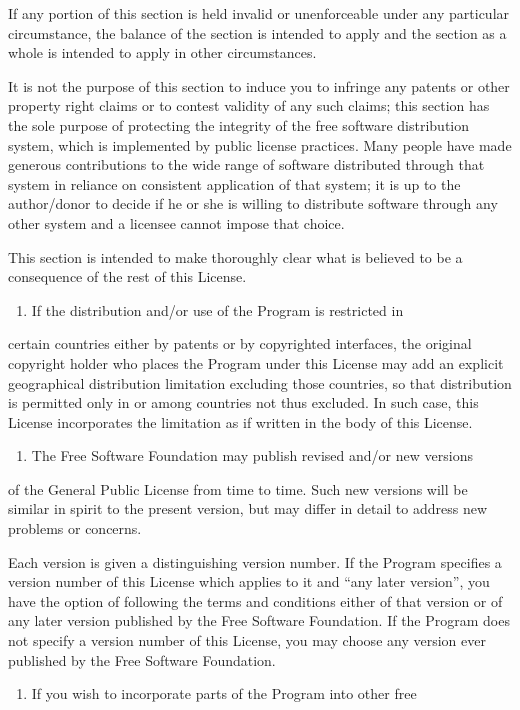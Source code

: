 \documentclass[letterpaper,10pt,english]{sphinxmanual}
\begin{document}
If any portion of this section is held invalid or unenforceable under
any particular circumstance, the balance of the section is intended to
apply and the section as a whole is intended to apply in other
circumstances.

It is not the purpose of this section to induce you to infringe any
patents or other property right claims or to contest validity of any
such claims; this section has the sole purpose of protecting the
integrity of the free software distribution system, which is
implemented by public license practices.  Many people have made
generous contributions to the wide range of software distributed
through that system in reliance on consistent application of that
system; it is up to the author/donor to decide if he or she is willing
to distribute software through any other system and a licensee cannot
impose that choice.

This section is intended to make thoroughly clear what is believed to
be a consequence of the rest of this License.
\begin{enumerate}
%
\setcounter{enumi}{7}
\item {} 
If the distribution and/or use of the Program is restricted in

\end{enumerate}

certain countries either by patents or by copyrighted interfaces, the
original copyright holder who places the Program under this License
may add an explicit geographical distribution limitation excluding
those countries, so that distribution is permitted only in or among
countries not thus excluded.  In such case, this License incorporates
the limitation as if written in the body of this License.
\begin{enumerate}
%
\setcounter{enumi}{8}
\item {} 
The Free Software Foundation may publish revised and/or new versions

\end{enumerate}

of the General Public License from time to time.  Such new versions will
be similar in spirit to the present version, but may differ in detail to
address new problems or concerns.

Each version is given a distinguishing version number.  If the Program
specifies a version number of this License which applies to it and “any
later version”, you have the option of following the terms and conditions
either of that version or of any later version published by the Free
Software Foundation.  If the Program does not specify a version number of
this License, you may choose any version ever published by the Free Software
Foundation.
\begin{enumerate}
%
\setcounter{enumi}{9}
\item {} 
If you wish to incorporate parts of the Program into other free

\end{enumerate}
\end{document}
